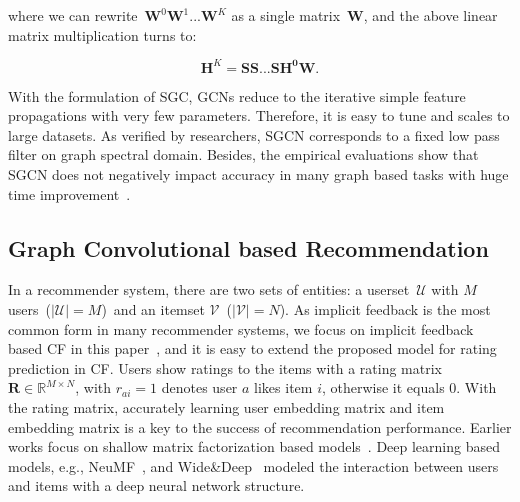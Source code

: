 \documentclass[letterpaper]{article} %
\newcommand{\Mat}[1]{\mathbf{#1}}
\begin{document}
\noindent where we can rewrite~{\small$\Mat{W}^0\Mat{W}^1...\Mat{W}^K$} as a single matrix~$\Mat{W}$, and the above linear matrix multiplication turns to:

\begin{small}
\begin{equation} \label{eqsgcn_1}
\mathbf{H}^{K}=\mathbf{\mathbf{S}\mathbf{S}...\mathbf{S}\mathbf{H^0}\Mat{W}}.
\end{equation}
\end{small}

With the formulation of SGC, GCNs reduce to the iterative simple feature propagations with very few parameters. Therefore, it is easy to tune and scales to large datasets. As verified by researchers, SGCN corresponds to a fixed low pass filter on graph spectral domain. Besides, the empirical evaluations show that SGCN does not negatively impact accuracy in many graph based tasks with huge time improvement~\cite{ICML2019simplifying}.



\subsection{Graph Convolutional based Recommendation}
In a recommender system, there are two sets of entities: a userset~{\small$\mathcal{U}$} with {\small$M$} users~({\small{$|\mathcal{U}|\!=\!M$}})~and an itemset {\small$\mathcal{V}$}~({\small{$|\mathcal{V}|\!=\!N$}}). As implicit feedback is the most common form in many recommender systems, we focus on implicit feedback based CF in this paper~\cite{UAI2009bpr}, and it is easy to extend the proposed model for rating prediction in CF.
Users show ratings to the items with a rating matrix~{\small$\Mat{R}\in \mathbb{R}^{M\times N}$}, with $r_{ai}\!=\!1$  denotes user $a$ likes item $i$, otherwise it equals 0. With the rating matrix, accurately learning user embedding matrix and item embedding matrix is a key to the success of recommendation performance. Earlier works focus on shallow matrix factorization based models~\cite{koren2009matrix,UAI2009bpr}. Deep learning based models, e.g., NeuMF~\cite{WWW2017neural}, and Wide\&Deep~\cite{recsys2016wide} modeled the interaction between users and items with a deep neural network structure.
\end{document}
